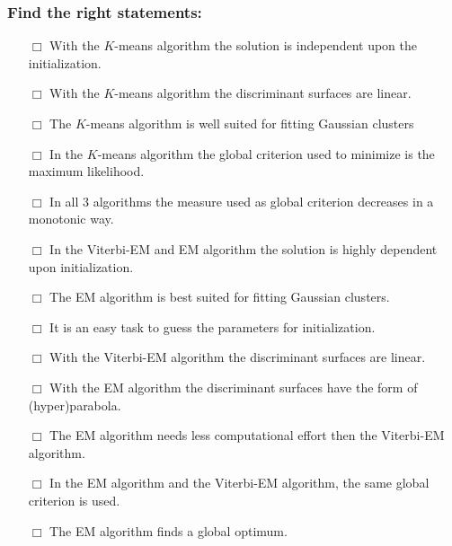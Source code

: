 \documentclass[a4paper]{article}
\begin{document}
\subsubsection*{Find the right statements:}
\begin{itemize}
\item[$\Box$] With the $K$-means algorithm the solution is independent
  upon the initialization.
\item[$\Box$] With the $K$-means algorithm the discriminant surfaces are
  linear.
\item[$\Box$] The $K$-means algorithm is well suited for fitting
  Gaussian clusters
\item[$\Box$] In the $K$-means algorithm the global criterion used to
  minimize is the maximum likelihood.
\item[$\Box$] In all 3 algorithms the measure used as global criterion
  decreases in a monotonic way.
\item[$\Box$] In the Viterbi-EM and EM algorithm the solution is
  highly dependent upon initialization.
\item[$\Box$] The EM algorithm is best suited for fitting Gaussian
  clusters.
\item[$\Box$] It is an easy task to guess the parameters for
  initialization.
\item[$\Box$] With the Viterbi-EM algorithm the discriminant surfaces
  are linear.
\item[$\Box$] With the EM algorithm the discriminant surfaces have the
  form of (hyper)parabola.
\item[$\Box$] The EM algorithm needs less computational effort then
  the Viterbi-EM algorithm.
\item[$\Box$] In the EM algorithm and the Viterbi-EM algorithm, the
  same global criterion is used.
\item[$\Box$] The EM algorithm finds a global optimum.
\end{itemize}
\end{document}
